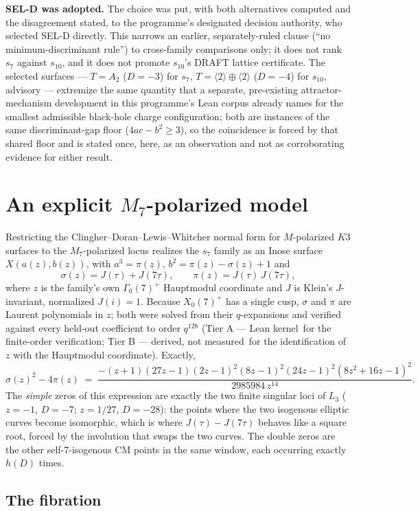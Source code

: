 \documentclass[11pt,a4paper]{article}
\theoremstyle{remark}
\newcommand{\tierA}{\colorbox{green!15}{\textsf{\scriptsize Tier A --- Lean kernel}}}
\newcommand{\tierB}{\colorbox{yellow!20}{\textsf{\scriptsize Tier B --- derived, not measured}}}
\begin{document}
\textbf{SEL-D was adopted.} The choice was put, with both alternatives computed and the disagreement
stated, to the programme's designated decision authority, who selected SEL-D directly. This narrows an
earlier, separately-ruled clause (``no minimum-discriminant rule'') to cross-family comparisons only; it
does not rank $s_7$ against $s_{10}$, and it does not promote $s_{10}$'s DRAFT lattice certificate. The
selected surfaces --- $T=A_2$ ($D=-3$) for $s_7$, $T=\langle2\rangle\oplus\langle2\rangle$ ($D=-4$) for
$s_{10}$, advisory --- extremize the same quantity that a separate, pre-existing attractor-mechanism
development in this programme's Lean corpus already names for the smallest admissible black-hole charge
configuration; both are instances of the same discriminant-gap floor ($4ac-b^2\ge3$), so the coincidence
is forced by that shared floor and is stated once, here, as an observation and not as corroborating
evidence for either result.

\section{An explicit $M_7$-polarized model}\label{sec:model}

Restricting the Clingher--Doran--Lewis--Whitcher normal form for $M$-polarized $K3$ surfaces to the
$M_7$-polarized locus realizes the $s_7$ family as an Inose surface $X(a(z),b(z))$, with $a^3=\pi(z)$,
$b^2=\pi(z)-\sigma(z)+1$ and
\[
\sigma(z) = J(\tau)+J(7\tau), \qquad \pi(z) = J(\tau)\,J(7\tau),
\]
where $z$ is the family's own $\Gamma_0(7)^+$ Hauptmodul coordinate and $J$ is Klein's $J$-invariant,
normalized $J(i)=1$. Because $X_0(7)^+$ has a single cusp, $\sigma$ and $\pi$ are Laurent polynomials in
$z$; both were solved from their $q$-expansions and verified against every held-out coefficient to order
$q^{128}$ (\tierA\ for the finite-order verification; \tierB\ for the identification of $z$ with the
Hauptmodul coordinate). Exactly,
\[
\sigma(z)^2-4\pi(z) \;=\; \frac{-(z+1)(27z-1)(2z-1)^2(8z-1)^2(24z-1)^2(8z^2+16z-1)^2}{2985984\,z^{14}}.
\]
The \emph{simple} zeros of this expression are exactly the two finite singular loci of $L_3$
($z=-1$, $D=-7$; $z=1/27$, $D=-28$): the points where the two isogenous elliptic curves become
isomorphic, which is where $J(\tau)-J(7\tau)$ behaves like a square root, forced by the involution that
swaps the two curves. The double zeros are the other self-$7$-isogenous CM points in the same window,
each occurring exactly $h(D)$ times.

\subsection{The fibration}\label{sec:fibration}
\end{document}
